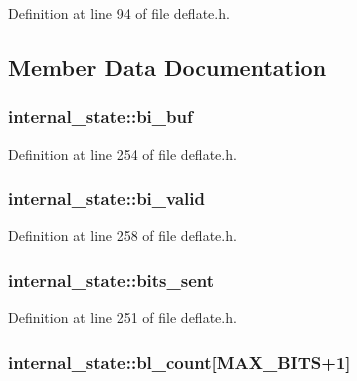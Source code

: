 Definition at line 94 of file deflate.\-h.



\subsection{Member Data Documentation}
\hypertarget{structinternal__state_a6880946d081053778f5f544b04603d13}{
\subsubsection[{bi\-\_\-buf}]{ internal\-\_\-state\-::bi\-\_\-buf}}\label{structinternal__state_a6880946d081053778f5f544b04603d13}


Definition at line 254 of file deflate.\-h.

\hypertarget{structinternal__state_a241f3606e41a3aa0ef22868a41bd9a0f}{
\subsubsection[{bi\-\_\-valid}]{ internal\-\_\-state\-::bi\-\_\-valid}}\label{structinternal__state_a241f3606e41a3aa0ef22868a41bd9a0f}


Definition at line 258 of file deflate.\-h.

\hypertarget{structinternal__state_aee0c85796a195200d20ff447859dec9b}{
\subsubsection[{bits\-\_\-sent}]{ internal\-\_\-state\-::bits\-\_\-sent}}\label{structinternal__state_aee0c85796a195200d20ff447859dec9b}


Definition at line 251 of file deflate.\-h.

\hypertarget{structinternal__state_abf9e786c8e5b4ab5d620ab123208034c}{
\subsubsection[{bl\-\_\-count}]{ internal\-\_\-state\-::bl\-\_\-count\mbox{[}M\-A\-X\-\_\-\-B\-I\-T\-S+1\mbox{]}}}\label{structinternal__state_abf9e786c8e5b4ab5d620ab123208034c}



